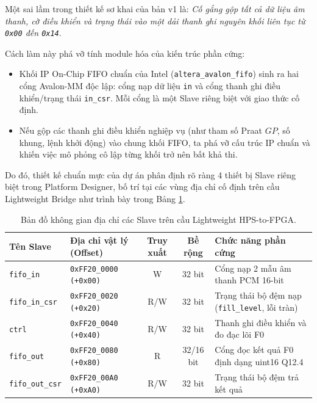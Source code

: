 Một sai lầm trong thiết kế sơ khai của bản v1 là: \emph{Cố gắng gộp tất cả dữ liệu âm thanh, cờ điều khiển và trạng thái vào một dải thanh ghi nguyên khối liên tục từ \texttt{0x00} đến \texttt{0x14}}.

Cách làm này phá vỡ tính module hóa của kiến trúc phần cứng:
\begin{itemize}[leftmargin=1.5em, itemsep=2pt]
    \item Khối IP On-Chip FIFO chuẩn của Intel (\texttt{altera\_avalon\_fifo}) sinh ra hai cổng Avalon-MM độc lập: cổng nạp dữ liệu \texttt{in} và cổng thanh ghi điều khiển/trạng thái \texttt{in\_csr}. Mỗi cổng là một Slave riêng biệt với giao thức cố định.
    \item Nếu gộp các thanh ghi điều khiển nghiệp vụ (như tham số Praat $GP$, số khung, lệnh khởi động) vào chung khối FIFO, ta phá vỡ cấu trúc IP chuẩn và khiến việc mô phỏng cô lập từng khối trở nên bất khả thi.
\end{itemize}

Do đó, thiết kế chuẩn mực của dự án phân định rõ ràng 4 thiết bị Slave riêng biệt trong Platform Designer, bố trí tại các vùng địa chỉ cố định trên cầu Lightweight Bridge như trình bày trong Bảng \ref{tab:ch01_reg_map}.

\begin{table}[H]
\centering
\caption{Bản đồ không gian địa chỉ các Slave trên cầu Lightweight HPS-to-FPGA.}
\label{tab:ch01_reg_map}
\footnotesize
\setlength{\tabcolsep}{4pt}
\begin{tabular}{llccl}
\toprule
\textbf{Tên Slave} & \textbf{Địa chỉ vật lý (Offset)} & \textbf{Truy xuất} & \textbf{Bề rộng} & \textbf{Chức năng phần cứng} \\
\midrule
\texttt{fifo\_in}      & \texttt{0xFF20\_0000 (+0x00)} & W   & 32 bit & Cổng nạp 2 mẫu âm thanh PCM 16-bit \\
\texttt{fifo\_in\_csr}  & \texttt{0xFF20\_0020 (+0x20)} & R/W & 32 bit & Trạng thái bộ đệm nạp (\texttt{fill\_level}, lỗi tràn) \\
\texttt{ctrl}          & \texttt{0xFF20\_0040 (+0x40)} & R/W & 32 bit & Thanh ghi điều khiển và đo đạc lõi F0 \\
\texttt{fifo\_out}     & \texttt{0xFF20\_0080 (+0x80)} & R   & 32/16 bit & Cổng đọc kết quả F0 định dạng uint16 Q12.4 \\
\texttt{fifo\_out\_csr} & \texttt{0xFF20\_00A0 (+0xA0)} & R/W & 32 bit & Trạng thái bộ đệm trả kết quả \\
\bottomrule
\end{tabular}
\end{table}

